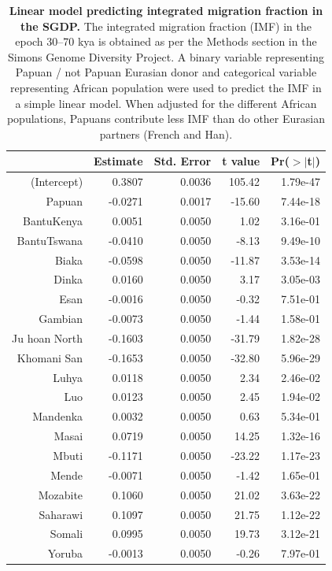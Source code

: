 \begin{table}[ht]
  \centering
  \begin{tabular}{rrrrr}
    \hline
   & Estimate & Std. Error & t value & Pr($>$$|$t$|$) \\ 
    \hline
  (Intercept) & 0.3807 & 0.0036 & 105.42 & 1.79e-47 \\ 
    Papuan & -0.0271 & 0.0017 & -15.60 & 7.44e-18 \\ 
    BantuKenya & 0.0051 & 0.0050 & 1.02 & 3.16e-01 \\ 
    BantuTswana & -0.0410 & 0.0050 & -8.13 & 9.49e-10 \\ 
    Biaka & -0.0598 & 0.0050 & -11.87 & 3.53e-14 \\ 
    Dinka & 0.0160 & 0.0050 & 3.17 & 3.05e-03 \\ 
    Esan & -0.0016 & 0.0050 & -0.32 & 7.51e-01 \\ 
    Gambian & -0.0073 & 0.0050 & -1.44 & 1.58e-01 \\ 
    Ju hoan North & -0.1603 & 0.0050 & -31.79 & 1.82e-28 \\ 
    Khomani San & -0.1653 & 0.0050 & -32.80 & 5.96e-29 \\ 
    Luhya & 0.0118 & 0.0050 & 2.34 & 2.46e-02 \\ 
    Luo & 0.0123 & 0.0050 & 2.45 & 1.94e-02 \\ 
    Mandenka & 0.0032 & 0.0050 & 0.63 & 5.34e-01 \\ 
    Masai & 0.0719 & 0.0050 & 14.25 & 1.32e-16 \\ 
    Mbuti & -0.1171 & 0.0050 & -23.22 & 1.17e-23 \\ 
    Mende & -0.0071 & 0.0050 & -1.42 & 1.65e-01 \\ 
    Mozabite & 0.1060 & 0.0050 & 21.02 & 3.63e-22 \\ 
    Saharawi & 0.1097 & 0.0050 & 21.75 & 1.12e-22 \\ 
    Somali & 0.0995 & 0.0050 & 19.73 & 3.12e-21 \\ 
    Yoruba & -0.0013 & 0.0050 & -0.26 & 7.97e-01 \\ 
     \hline
  \end{tabular}
  \caption{{\bf Linear model predicting integrated migration fraction in the SGDP.} The integrated migration fraction (IMF) in the epoch 30--70 kya is obtained as per the Methods section in the Simons Genome Diversity Project.  A binary variable representing Papuan / not Papuan Eurasian donor and categorical variable representing African population were used to predict the IMF in a simple linear model. When adjusted for the different African populations, Papuans contribute less IMF than do other Eurasian partners (French and Han).} 
  \label{table:sgdp:papuan_imf}
  \end{table}
  
